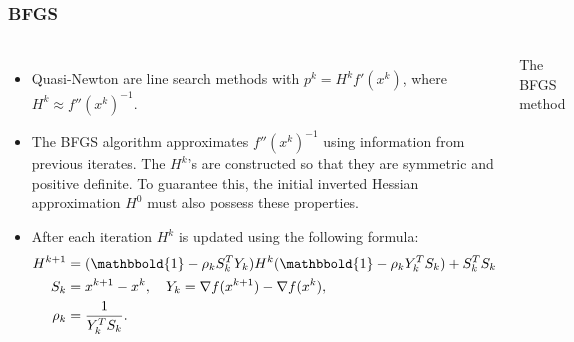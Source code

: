 \documentclass[9pt]{beamer}
\begin{document}
\begin{frame}
\frametitle{BFGS}
\begin{columns}
\begin{itemize}
\item{Quasi-Newton are line search methods with $p^k=H^kf'(x^k)$, where $H^k\approx f''(x^k)^{-1}$.}
\item{The BFGS algorithm approximates $f''(x^k)^{-1}$ using information from previous iterates. The $H^k$'s are constructed so that they are symmetric and positive definite. To guarantee this, the initial inverted Hessian approximation $H^0$ must also possess these properties.}
\item{After each iteration $H^k$ is updated using the following formula:}
{\tiny
\begin{align*}
H^{k+1} &= (\mathbbold{1}-\rho_kS_k^T Y_k)H^k(\mathbbold{1} -\rho_kY_k^T S_k) + S_k^T S_k\\
S_k &= x^{k+1}-x^{k},
\quad Y_k = \nabla f(x^{k+1})-\nabla f(x^{k}),\\
\rho_k &= \frac{1}{Y_k^T S_k}.
\end{align*}
}%
\end{itemize}
{\small
\begin{algorithm}[H] 
\caption{The BFGS method\label{SEQ_ALG}}
\end{algorithm}
}
\end{columns}
\end{frame}
\end{document}
